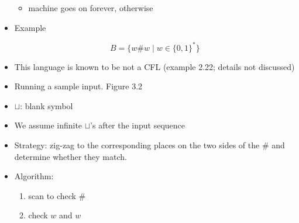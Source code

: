 \begin{frame}[allowframebreaks]
\begin{itemize}
\begin{itemize}
  \item machine goes on forever, otherwise
  \end{itemize}
\item Example

  \begin{equation*}
B=\{w\#w\mid w \in \{0,1\}^*\}
\end{equation*}
\item This language is known to be not a CFL (example 2.22; details
  not discussed)

\item Running a sample input. Figure 3.2
\item $\sqcup$: blank symbol
\item [] We assume infinite $\sqcup$'s after the input sequence
\item Strategy: zig-zag to the corresponding places on the two sides of the \# and determine
  whether they match.
  
\begin{center}
\end{center}



\item Algorithm:
  \begin{enumerate}
  \item scan to check \#
  \item check $w$ and $w$
  \end{enumerate}

\end{itemize}
\end{frame}

